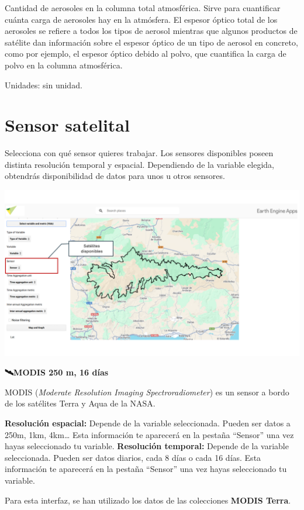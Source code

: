 \documentclass[
]{book}
\begin{document}
Cantidad de aerosoles en la columna total atmosférica. Sirve para cuantificar cuánta carga de aerosoles hay en la atmósfera. El espesor óptico total de los aerosoles se refiere a todos los tipos de aerosol mientras que algunos productos de satélite dan información sobre el espesor óptico de un tipo de aerosol en concreto, como por ejemplo, el espesor óptico debido al polvo, que cuantifica la carga de polvo en la columna atmosférica.

Unidades: sin unidad.

\chapter{Sensor satelital}\label{sensor}

Selecciona con qué sensor quieres trabajar. Los sensores disponibles poseen distinta resolución temporal y espacial. Dependiendo de la variable elegida, obtendrás disponibilidad de datos para unos u otros sensores.

\includegraphics{assets/sensor_es.png}

\textbf{🛰️MODIS 250 m, 16 días}

MODIS (\emph{Moderate Resolution Imaging Spectroradiometer}) es un sensor a bordo de los satélites Terra y Aqua de la NASA.

\textbf{Resolución espacial:} Depende de la variable seleccionada. Pueden ser datos a 250m, 1km, 4km\ldots{} Esta información te aparecerá en la pestaña ``Sensor'' una vez hayas seleccionado tu variable.
\textbf{Resolución temporal:} Depende de la variable seleccionada. Pueden ser datos diarios, cada 8 días o cada 16 días. Esta información te aparecerá en la pestaña ``Sensor'' una vez hayas seleccionado tu variable.

Para esta interfaz, se han utilizado los datos de las colecciones \textbf{MODIS Terra}.
\end{document}
